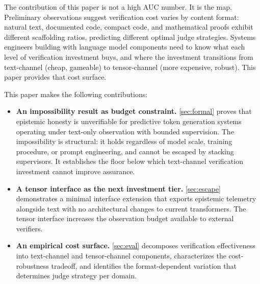 The contribution of this paper is not a high AUC number. It is the map.
Preliminary observations suggest verification cost varies by content
format: natural text, documented code, compact code, and mathematical
proofs exhibit different scaffolding ratios, predicting different optimal
judge strategies. Systems engineers building with language model components
need to know what each level of verification investment buys, and where the
investment transitions from text-channel (cheap, gameable) to
tensor-channel (more expensive, robust). This paper provides that cost
surface.

This paper makes the following contributions:

\begin{itemize}
\item \textbf{An impossibility result as budget constraint.}
  \autoref{sec:formal} proves that
  epistemic honesty is unverifiable for predictive token generation
  systems operating under text-only observation with bounded
  supervision. The impossibility is structural: it holds regardless
  of model scale, training procedure, or prompt engineering, and
  cannot be escaped by stacking supervisors. It establishes the
  floor below which text-channel verification investment cannot improve
  assurance.

\item \textbf{A tensor interface as the next investment tier.}
  \autoref{sec:escape} demonstrates a minimal interface extension that exports
  epistemic telemetry alongside text with no architectural changes to
  current transformers. The tensor interface increases the observation
  budget available to external verifiers.

\item \textbf{An empirical cost surface.}
  \autoref{sec:eval} decomposes verification effectiveness into
  text-channel and tensor-channel components, characterizes the
  cost-robustness tradeoff, and identifies the format-dependent
  variation that determines judge strategy per domain.
\end{itemize}
